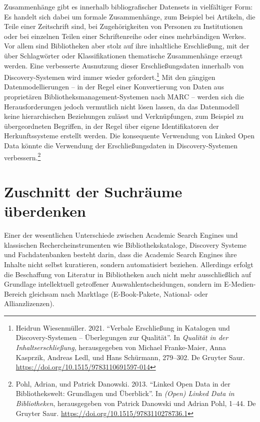 \documentclass[a4paper,
fontsize=11pt,
oneside,
numbers=noperiodatend,
parskip=half-,
bibliography=totoc,
final
]{scrartcl}
\begin{document}
Zusammenhänge gibt es innerhalb bibliografischer Datensets in
vielfältiger Form: Es handelt sich dabei um formale Zusammenhänge, zum
Beispiel bei Artikeln, die Teile einer Zeitschrift sind, bei
Zugehörigkeiten von Personen zu Institutionen oder bei einzelnen Teilen
einer Schriftenreihe oder eines mehrbändigen Werkes. Vor allem sind
Bibliotheken aber stolz auf ihre inhaltliche Erschließung, mit der über
Schlagwörter oder Klassifikationen thematische Zusammenhänge erzeugt
werden. Eine verbesserte Ausnutzung dieser Erschließungsdaten innerhalb
von Discovery-Systemen wird immer wieder gefordert.\footnote{Heidrun
  Wiesenmüller. 2021. \enquote{Verbale Erschließung in Katalogen und
  Discovery-Systemen -- Überlegungen zur Qualität}. In \emph{Qualität in
  der Inhaltserschließung}, herausgegeben von Michael Franke-Maier, Anna
  Kasprzik, Andreas Ledl, und Hans Schürmann, 279--302. De Gruyter Saur.
  \url{https://doi.org/10.1515/9783110691597-014}} Mit den gängigen
Datenmodellierungen -- in der Regel einer Konvertierung von Daten aus
proprietären Bibliotheksmanagement-Systemen nach MARC -- werden sich die
Herausforderungen jedoch vermutlich nicht lösen lassen, da das
Datenmodell keine hierarchischen Beziehungen zulässt und Verknüpfungen,
zum Beispiel zu übergeordneten Begriffen, in der Regel über eigene
Identifikatoren der Herkunftssysteme erstellt werden. Die konsequente
Verwendung von Linked Open Data könnte die Verwendung der
Erschließungsdaten in Discovery-Systemen verbessern.\footnote{Pohl,
  Adrian, und Patrick Danowski. 2013. \enquote{Linked Open Data in der
  Bibliothekswelt: Grundlagen und Überblick}. In \emph{(Open) Linked
  Data in Bibliotheken}, herausgegeben von Patrick Danowski und Adrian
  Pohl, 1--44. De Gruyter Saur.
  \url{https://doi.org/10.1515/9783110278736.1}}

\hypertarget{zuschnitt-der-suchruxe4ume-uxfcberdenken}{%
\section{Zuschnitt der Suchräume
überdenken}\label{zuschnitt-der-suchruxe4ume-uxfcberdenken}}

Einer der wesentlichen Unterschiede zwischen Academic Search Engines und
klassischen Rechercheinstrumenten wie Bibliothekskataloge, Discovery
Systeme und Fachdatenbanken besteht darin, dass die Academic Search
Engines ihre Inhalte nicht selbst kuratieren, sondern automatisiert
beziehen. Allerdings erfolgt die Beschaffung von Literatur in
Bibliotheken auch nicht mehr ausschließlich auf Grundlage intellektuell
getroffener Auswahlentscheidungen, sondern im E-Medien-Bereich gleichsam
nach Marktlage (E-Book-Pakete, National- oder Allianzlizenzen).
\end{document}
